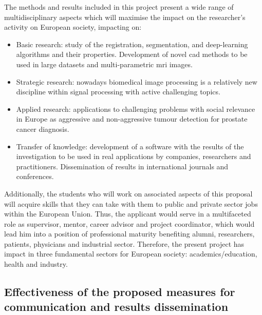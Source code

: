The methods and results included in this project present a wide range of multidisciplinary aspects which will maximise the impact on the researcher's activity on European society, impacting on:
\begin{itemize}[noitemsep]
\item Basic research: study of the registration, segmentation, and deep-learning algorithms and their properties.
Development of novel \ac{cad} methods to be used in large datasets and multi-parametric \ac{mri} images.
\item Strategic research: nowadays biomedical image processing is a relatively new discipline within signal processing with active challenging topics.
\item Applied research: applications to challenging problems with social relevance in Europe as aggressive and non-aggressive tumour detection for prostate cancer diagnosis.
\item Transfer of knowledge: development of a software with the results of the investigation to be used in real applications by companies, researchers and practitioners.
Dissemination of results in international journals and conferences.
\end{itemize}

Additionally, the students who will work on associated aspects of this proposal will acquire skills that they can take with them to public and private sector jobs within the European Union. 
Thus, the applicant would serve in a multifaceted role as supervisor, mentor, career advisor and project coordinator, which would lead him into a position of professional maturity benefiting alumni, researchers, patients, physicians and industrial sector.
Therefore, the present project has impact in three fundamental sectors for European society: academics/education, health and industry.

\subsection{Effectiveness of the proposed measures for communication and results dissemination}

